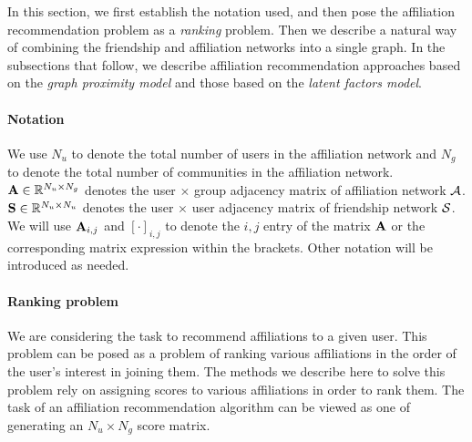 In this section, we first establish the notation used, and then pose the affiliation recommendation problem as a \emph{ranking} problem. Then we describe a natural way of combining the friendship and affiliation networks into a single graph. In the subsections that follow, we describe affiliation recommendation approaches based on the \textit{graph proximity model} and those based on the \textit{latent factors model}.

\paragraph*{Notation}
We use $N_u$ to denote the total number of users in the affiliation network and $N_g$ to denote the total number of communities in the affiliation network. $\mathbf{A} \in \mathbb{R}^{N_u \times N_g}$ denotes the user $\times$ group adjacency matrix of affiliation network $\mathcal{A}$. $\mathbf{S} \in \mathbb{R}^{N_u \times N_u}$ denotes the user $\times$ user adjacency matrix of friendship network $\mathcal{S}$. We will use $\mathbf{A}_{i,j}$ and $[\cdot]_{i,j}$ to denote the $i,j$ entry of the matrix $\mathbf{A}$ or the corresponding matrix expression within the brackets. Other notation will be introduced as needed.

\paragraph*{Ranking problem}
We are considering the task to recommend affiliations to a given user. This problem can be posed as a problem of ranking various affiliations in the order of the user's interest in joining them. The methods we describe here to solve this problem rely on assigning scores to various affiliations in order to rank them. The task of an affiliation recommendation algorithm can be viewed as one of generating an $N_u \times N_g$ score matrix. 

